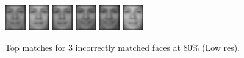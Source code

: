 \begin{figure}[hbt]
  \includegraphics[width=0.08\textwidth]{../results/L_rez/incorrect80/3/5.jpg}
  \includegraphics[width=0.08\textwidth]{../results/L_rez/incorrect80/3/6.jpg}
  \includegraphics[width=0.08\textwidth]{../results/L_rez/incorrect80/3/7.jpg}
  \includegraphics[width=0.08\textwidth]{../results/L_rez/incorrect80/3/8.jpg}
  \includegraphics[width=0.08\textwidth]{../results/L_rez/incorrect80/3/8.jpg}
  \includegraphics[width=0.08\textwidth]{../results/L_rez/incorrect80/3/10.jpg}
  \caption{Top matches for 3 incorrectly matched faces at 80\% (Low res).}
  \label{fig:incorrect80_l}
\end{figure}

~\vfill

\clearpage

~\vfill

